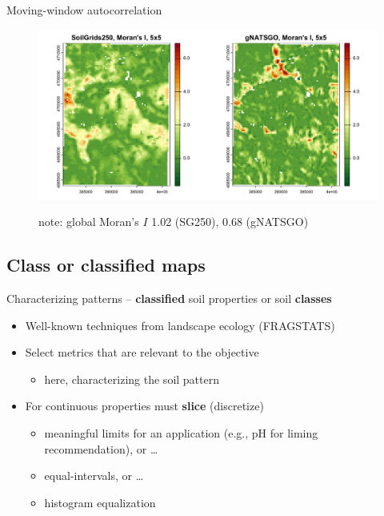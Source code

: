 \documentclass[aspectratio=169, 10pt]{beamer}
\begin{document}
\begin{frame}{Moving-window autocorrelation}
    \begin{figure}
        \centering
        \includegraphics[height=0.7\textheight]{./graphics_david/moving-window-5-1.png}

        \begin{footnotesize}
          note: global Moran's $I$ 1.02 (SG250), 0.68 (gNATSGO)
        \end{footnotesize}
    \end{figure}
\end{frame}



\subsection{Class or classified maps}

\begin{frame}{Characterizing patterns -- \textbf{classified} soil properties or soil \textbf{classes}}
\begin{itemize}
    \item Well-known techniques from landscape ecology (FRAGSTATS)
    \item Select metrics that are relevant to the objective
    \begin{itemize}
        \item here, characterizing the soil pattern
    \end{itemize}
    \item For continuous properties must \textbf{slice} (discretize)
    \begin{itemize}
        \item meaningful limits for an application (e.g., pH for liming recommendation), or \ldots
        \item equal-intervals, or \ldots
        \item histogram equalization
    \end{itemize}
\end{itemize}
\end{frame}
\end{document}
